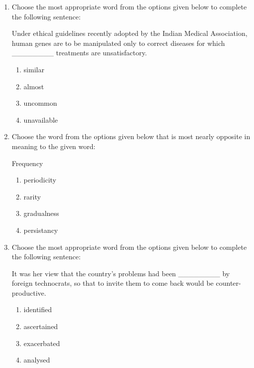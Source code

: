 \documentclass[journal,9pt,onecolumn]{IEEEtran}
\begin{document}
\begin{enumerate}

\item Choose the most appropriate word from the options given below to complete the following sentence:

Under ethical guidelines recently adopted by the Indian Medical Association, human genes are to be manipulated only to correct diseases for which \_\_\_\_\_\_\_\_ treatments are unsatisfactory.
\begin{multicols}{4}
\begin{enumerate}
    \item similar
    \item almost
    \item uncommon
    \item unavailable
\end{enumerate}
\end{multicols}
 
\item Choose the word from the options given below that is most nearly opposite in meaning to the given word:

Frequency
\begin{multicols}{4}
\begin{enumerate}
    \item periodicity
    \item rarity
    \item gradualness
    \item persistancy
\end{enumerate}
\end{multicols}


\item Choose the most appropriate word from the options given below to complete the following sentence:

It was her view that the country's problems had been \_\_\_\_\_\_\_\_ by foreign technocrats, so that to invite them to come back would be counter-productive.
\begin{multicols}{4}
\begin{enumerate}
    \item identified
    \item ascertained
    \item exacerbated
    \item analysed
\end{enumerate}
\end{multicols}


\end{enumerate}
\end{document}

